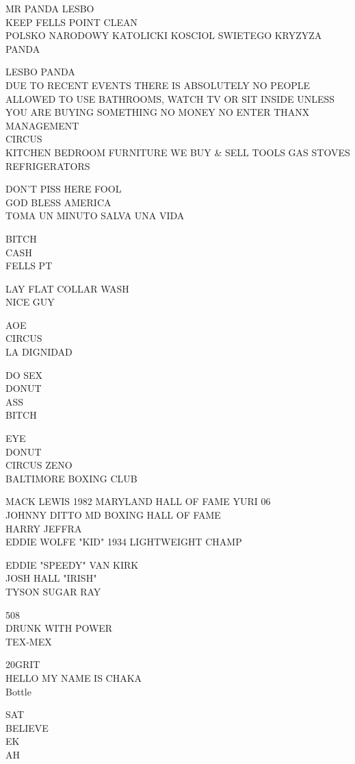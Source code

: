 \documentclass[10pt,letterpaper]{article}
\begin{document}
MR PANDA LESBO\\
KEEP FELLS POINT CLEAN\\
POLSKO NARODOWY KATOLICKI KOSCIOL SWIETEGO KRYZYZA\\
PANDA

LESBO PANDA\\
DUE TO RECENT EVENTS THERE IS ABSOLUTELY NO PEOPLE ALLOWED TO USE BATHROOMS, WATCH TV OR SIT INSIDE UNLESS YOU ARE BUYING SOMETHING NO MONEY NO ENTER THANX MANAGEMENT\\
CIRCUS\\
KITCHEN BEDROOM FURNITURE WE BUY \& SELL TOOLS GAS STOVES REFRIGERATORS

DON'T PISS HERE FOOL\\
GOD BLESS AMERICA\\
TOMA UN MINUTO SALVA UNA VIDA

BITCH\\
CASH\\
FELLS PT

LAY FLAT COLLAR WASH\\
NICE GUY

AOE\\
CIRCUS\\
LA DIGNIDAD

DO SEX\\
DONUT\\
ASS\\
BITCH

EYE\\
DONUT\\
CIRCUS ZENO\\
BALTIMORE BOXING CLUB

MACK LEWIS 1982 MARYLAND HALL OF FAME YURI 06\\
JOHNNY DITTO MD BOXING HALL OF FAME\\
HARRY JEFFRA\\
EDDIE WOLFE "KID" 1934 LIGHTWEIGHT CHAMP

EDDIE "SPEEDY" VAN KIRK\\
JOSH HALL "IRISH"\\
TYSON SUGAR RAY

508\\
DRUNK WITH POWER\\
TEX{-}MEX

20GRIT\\
HELLO MY NAME IS CHAKA\\
Bottle

SAT\\
BELIEVE\\
EK\\
AH
\end{document}
